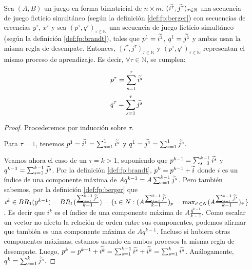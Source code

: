 \begin{lemma} \label{lema:equiv:sim}
    Sea $(A, B)$ un juego en forma bimatricial de $n \times m$, $(\widetilde{i^\tau}, \widetilde{j^\tau})_{\tau \in \mathbb{N}}$ una secuencia de juego ficticio simultáneo (según la definición \ref{def:fp:berger}) con secuencias de creencias $y^\tau$, $x^\tau$ y sea $(p^\tau, q^\tau)_{\tau \in \mathbb{N}}$ una secuencia de juego ficticio simultáneo (según la definición \ref{def:fp:brandt}), tales que $p^1 = \widetilde{i^1}$, $q^1 = \widetilde{j^1}$ y ambas usan la misma regla de desempate. Entonces, $(i^\tau, j^\tau)_{\tau \in \mathbb{N}}$ y $(p^\tau, q^\tau)_{\tau \in \mathbb{N}}$ representan el mismo proceso de aprendizaje. Es decir, $\forall \tau \in \mathbb{N}$, se cumplen:

    \[ p^{\tau} = \sum_{s=1}^\tau{\widetilde{i^s}} \]
    \[ q^{\tau} = \sum_{s=1}^\tau{\widetilde{j^s}} \]

\end{lemma}
\begin{proof}
    Procederemos por inducción sobre $\tau$.

    Para $\tau = 1$, tenemos $p^1 = \widetilde{i^1} = \sum_{s=1}^1{\widetilde{i^s}}$ y $q^1 = \widetilde{j^1} = \sum_{s=1}^1{\widetilde{j^s}}$.

    Veamos ahora el caso de un $\tau = k > 1$, suponiendo que $p^{k-1} = \sum_{s=1}^{k-1}{\widetilde{i^s}}$ y $q^{k-1} = \sum_{s=1}^{k-1}{\widetilde{j^s}}$. Por la definición \ref{def:fp:brandt}, $p^k = p^{k-1} + \widetilde{i}$ donde $i$ es un índice de una componente máxima de $Aq^{k-1} = A\sum_{s=1}^{k-1}{\widetilde{j^s}}$. Pero también sabemos, por la definición \ref{def:fp:berger} que $i^k \in BR_1(y^{k-1}) = BR_1(\frac{\sum_{s=1}^{k-1} \widetilde{j^s}}{k-1}) = \{i \in N : (A\frac{\sum_{s=1}^{k-1} \widetilde{j^s}}{k-1})_p = \max_{i' \in N} (A\frac{\sum_{s=1}^{k-1} \widetilde{j^s}}{k-1})_{i'}\}$. Es decir que $i^k$ es el índice de una componente máxima de $A\frac{q^{k-1}}{k-1}$. Como escalar un vector no afecta la relación de orden entre sus componentes, podemos afirmar que también es una componente máxima de $Aq^{k-1}$. Incluso si hubiera otras componentes máximas, estamos usando en ambos procesos la misma regla de desempate. Luego, $p^k = p^{k-1} + \widetilde{i^k} = \sum_{s=1}^{k-1}{\widetilde{i^s}} + \widetilde{i^k} = \sum_{s=1}^{k}{\widetilde{i^s}}$. Análogamente, $q^{k} = \sum_{s=1}^k{\widetilde{j^s}}$.
\end{proof}

